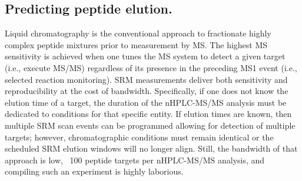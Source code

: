 \subsection*{Predicting peptide elution.}

Liquid chromatography is the conventional approach to fractionate highly complex peptide mixtures prior to measurement by MS. The highest MS sensitivity is achieved when one tunes the MS system to detect a given target (i.e., execute MS/MS) regardless of its presence in the preceding MS1 event (i.e., selected reaction monitoring). SRM measurements deliver both sensitivity and reproducibility at the cost of bandwidth. Specifically, if one does not know the elution time of a target, the duration of the nHPLC-MS/MS analysis must be dedicated to conditions for that specific entity. If elution times are known, then multiple SRM scan events can be programmed allowing for detection of multiple targets; however, chromatographic conditions must remain identical or the scheduled SRM elution windows will no longer align. Still, the bandwidth of that approach is low, ~100 peptide targets per nHPLC-MS/MS analysis, and compiling such an experiment is highly laborious.\cite{indexion}

